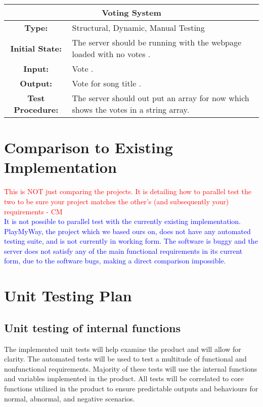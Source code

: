 \documentclass[12pt, titlepage]{article}
\begin{document}
\begin{center}
\begin{table}[H]
\begin{tabularx}{\textwidth}{| c X |}
\hline
\multicolumn{2}{|c|}{\textbf{Voting System}}\\
\hline
\textbf{Type: } & Structural, Dynamic, Manual Testing\\

\textbf{Initial State: } & The server should be running with the webpage loaded with no votes .\\

\textbf{Input: } & Vote .\\

\textbf{Output: } & Vote for song title .\\

\textbf{Test Procedure: } & The server should out put an array for now which shows the votes in a string array. \\
\hline
\end{tabularx}
\end{table}
\end{center}

\section{Comparison to Existing Implementation}
\textcolor{red}{This is NOT just comparing the projects. It is detailing how to parallel test the two to be sure your project matches the other's (and subsequently your) requirements - CM} \\

\textcolor{blue}{
It is not possible to parallel test with the currently existing implementation. PlayMyWay, the project which we based ours on, does not have any automated testing suite, and is not currently in working form. The software is buggy and the server does not satisfy any of the main functional requirements in its current form, due to the software bugs, making a direct comparison impossible.
}

\section{Unit Testing Plan}

\subsection{Unit testing of internal functions}
The implemented unit tests will help examine the product and will allow for clarity. The automated tests will be used to test a multitude of functional and nonfunctional requirements.  Majority of these tests will use the internal functions and variables implemented in the product. All tests will be correlated to core functions utilized in the product to ensure predictable outputs and behaviours for normal, abnormal, and negative scenarios.
\end{document}
